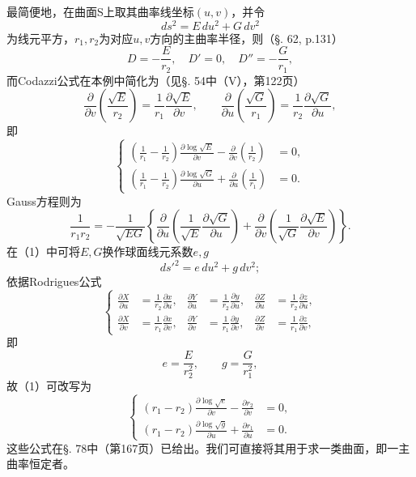 最简便地，在曲面S上取其曲率线坐标\((u,v)\)，并令
\[
 ds^2=E\,du^2+G\,dv^2
\]
为线元平方，\(r_1,r_2\)为对应\(u,v\)方向的主曲率半径，则（\S. 62, p.131）
\[
 D=-\frac{E}{r_2},\quad D'=0,\quad D''=-\frac{G}{r_1},
\]
而Codazzi公式在本例中简化为（见\S. 54中（V），第122页）
\[
 \frac{\partial}{\partial v}\left(\frac{\sqrt E}{r_2}\right)=\frac1{r_1}\frac{\partial\sqrt E}{\partial v},
 \qquad
 \frac{\partial}{\partial u}\left(\frac{\sqrt G}{r_1}\right)=\frac1{r_2}\frac{\partial\sqrt G}{\partial u},
\]
即
\begin{equation}\tag{1}
\left\{
\begin{aligned}
\left(\frac1{r_1}-\frac1{r_2}\right)\frac{\partial\log\sqrt E}{\partial v}-\frac{\partial}{\partial v}\left(\frac1{r_2}\right)&=0,\\
\left(\frac1{r_1}-\frac1{r_2}\right)\frac{\partial\log\sqrt G}{\partial u}+\frac{\partial}{\partial u}\left(\frac1{r_1}\right)&=0.
\end{aligned}
\right.
\end{equation}
Gauss方程则为
\begin{equation}\tag{2}
 \frac1{r_1r_2}=-\frac1{\sqrt{EG}}\left\{\frac{\partial}{\partial u}\left(\frac1{\sqrt E}\frac{\partial\sqrt G}{\partial u}\right)+\frac{\partial}{\partial v}\left(\frac1{\sqrt G}\frac{\partial\sqrt E}{\partial v}\right)\right\}.
\end{equation}
在（1）中可将\(E,G\)换作球面线元系数\(e,g\)
\[
 ds'^2=e\,du^2+g\,dv^2;
\]
依据Rodrigues公式
\begin{equation}\tag{3}
\left\{
\begin{aligned}
\frac{\partial X}{\partial u}&=\frac1{r_2}\frac{\partial x}{\partial u},&
\frac{\partial Y}{\partial u}&=\frac1{r_2}\frac{\partial y}{\partial u},&
\frac{\partial Z}{\partial u}&=\frac1{r_2}\frac{\partial z}{\partial u},\\
\frac{\partial X}{\partial v}&=\frac1{r_1}\frac{\partial x}{\partial v},&
\frac{\partial Y}{\partial v}&=\frac1{r_1}\frac{\partial y}{\partial v},&
\frac{\partial Z}{\partial v}&=\frac1{r_1}\frac{\partial z}{\partial v},
\end{aligned}
\right.
\end{equation}
即
\[
 e=\frac E{r_2^2},\qquad g=\frac G{r_1^2},
\]
故（1）可改写为
\begin{equation}\tag{4}
\left\{
\begin{aligned}
(r_1-r_2)\frac{\partial\log\sqrt e}{\partial v}-\frac{\partial r_2}{\partial v}&=0,\\
(r_1-r_2)\frac{\partial\log\sqrt g}{\partial u}+\frac{\partial r_1}{\partial u}&=0.
\end{aligned}
\right.
\end{equation}
这些公式在\S. 78中（第167页）已给出。我们可直接将其用于求一类曲面，即一主曲率恒定者。

